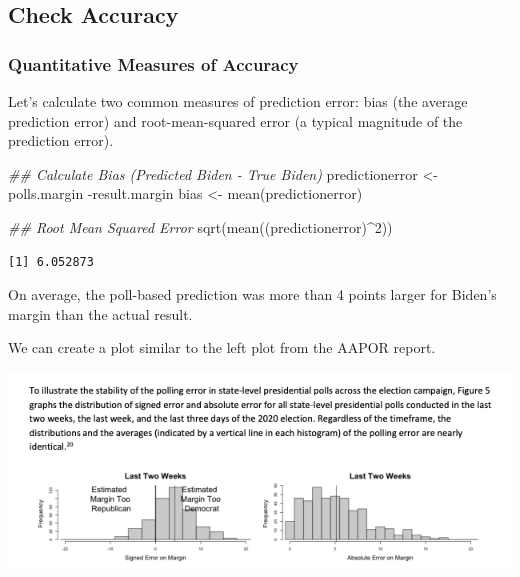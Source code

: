 \documentclass[
  letterpaper,
  DIV=11,
  numbers=noendperiod]{scrreprt}
\newenvironment{Shaded}{\begin{snugshade}}{\end{snugshade}}
\newcommand{\DecValTok}[1]{\textcolor[rgb]{0.68,0.00,0.00}{#1}}
\newcommand{\DocumentationTok}[1]{\textcolor[rgb]{0.37,0.37,0.37}{\textit{#1}}}
\newcommand{\FunctionTok}[1]{\textcolor[rgb]{0.28,0.35,0.67}{#1}}
\newcommand{\NormalTok}[1]{\textcolor[rgb]{0.00,0.23,0.31}{#1}}
\newcommand{\OtherTok}[1]{\textcolor[rgb]{0.00,0.23,0.31}{#1}}
\newcommand{\SpecialCharTok}[1]{\textcolor[rgb]{0.37,0.37,0.37}{#1}}
\begin{document}
\hypertarget{check-accuracy}{%
\subsection{Check Accuracy}\label{check-accuracy}}

\hypertarget{quantitative-measures-of-accuracy}{%
\subsubsection{Quantitative Measures of
Accuracy}\label{quantitative-measures-of-accuracy}}

Let's calculate two common measures of prediction error: bias (the
average prediction error) and root-mean-squared error (a typical
magnitude of the prediction error).

\begin{Shaded}
\begin{Highlighting}[]
\DocumentationTok{\#\# Calculate Bias (Predicted Biden {-} True Biden)}
\NormalTok{predictionerror }\OtherTok{\textless{}{-}}\NormalTok{ polls.margin }\SpecialCharTok{{-}}\NormalTok{result.margin }
\NormalTok{bias }\OtherTok{\textless{}{-}} \FunctionTok{mean}\NormalTok{(predictionerror)}

\DocumentationTok{\#\# Root Mean Squared Error}
\FunctionTok{sqrt}\NormalTok{(}\FunctionTok{mean}\NormalTok{((predictionerror)}\SpecialCharTok{\^{}}\DecValTok{2}\NormalTok{))}
\end{Highlighting}
\end{Shaded}

\begin{verbatim}
[1] 6.052873
\end{verbatim}

On average, the poll-based prediction was more than 4 points larger for
Biden's margin than the actual result.

We can create a plot similar to the left plot from the AAPOR report.

\includegraphics{images/aaporhist20.png}
\end{document}

